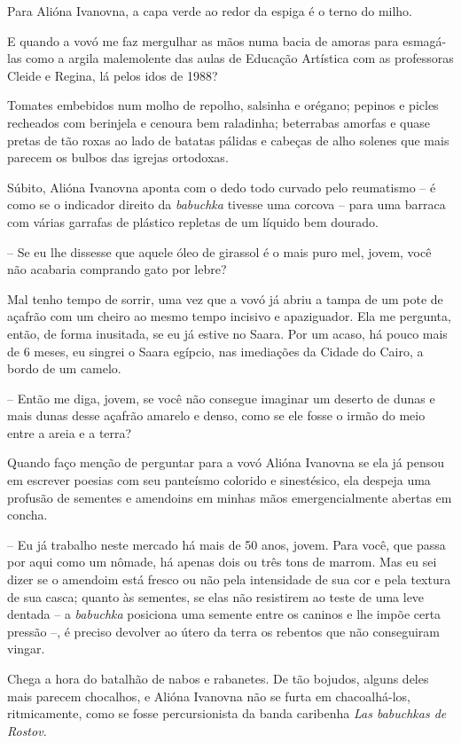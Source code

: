 Para Alióna Ivanovna, a capa verde ao redor da espiga é o terno do
milho.

E quando a vovó me faz mergulhar as mãos numa bacia de amoras para
esmagá-las como a argila malemolente das aulas de Educação Artística com
as professoras Cleide e Regina, lá pelos idos de 1988?

Tomates embebidos num molho de repolho, salsinha e orégano; pepinos e
picles recheados com berinjela e cenoura bem raladinha; beterrabas
amorfas e quase pretas de tão roxas ao lado de batatas pálidas e cabeças
de alho solenes que mais parecem os bulbos das igrejas ortodoxas.

Súbito, Alióna Ivanovna aponta com o dedo todo curvado pelo reumatismo
-- é como se o indicador direito da \emph{babuchka} tivesse uma corcova
-- para uma barraca com várias garrafas de plástico repletas de um
líquido bem dourado.

-- Se eu lhe dissesse que aquele óleo de girassol é o mais puro mel,
jovem, você não acabaria comprando gato por lebre?

Mal tenho tempo de sorrir, uma vez que a vovó já abriu a tampa de um
pote de açafrão com um cheiro ao mesmo tempo incisivo e apaziguador. Ela
me pergunta, então, de forma inusitada, se eu já estive no Saara. Por um
acaso, há pouco mais de 6 meses, eu singrei o Saara egípcio, nas
imediações da Cidade do Cairo, a bordo de um camelo.

-- Então me diga, jovem, se você não consegue imaginar um deserto de
dunas e mais dunas desse açafrão amarelo e denso, como se ele fosse o
irmão do meio entre a areia e a terra?

Quando faço menção de perguntar para a vovó Alióna Ivanovna se ela já
pensou em escrever poesias com seu panteísmo colorido e sinestésico, ela
despeja uma profusão de sementes e amendoins em minhas mãos
emergencialmente abertas em concha.

-- Eu já trabalho neste mercado há mais de 50 anos, jovem. Para você,
que passa por aqui como um nômade, há apenas dois ou três tons de
marrom. Mas eu sei dizer se o amendoim está fresco ou não pela
intensidade de sua cor e pela textura de sua casca; quanto às sementes,
se elas não resistirem ao teste de uma leve dentada -- a \emph{babuchka}
posiciona uma semente entre os caninos e lhe impõe certa pressão --, é
preciso devolver ao útero da terra os rebentos que não conseguiram
vingar.

Chega a hora do batalhão de nabos e rabanetes. De tão bojudos, alguns
deles mais parecem chocalhos, e Alióna Ivanovna não se furta em
chacoalhá-los, ritmicamente, como se fosse percursionista da banda
caribenha \emph{Las babuchkas de Rostov. }

